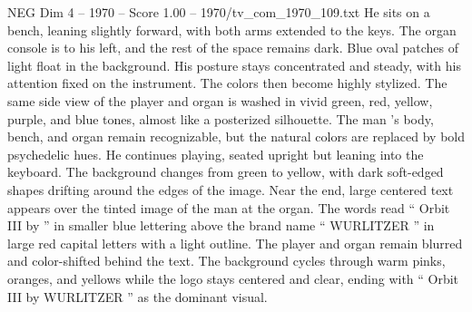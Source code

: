 \begin{textsample}{NEG Dim 4 – 1970 – Score 1.00 – 1970/tv\_com\_1970\_109.txt}
He sits on a bench, leaning slightly forward, with both arms extended to the keys.
The organ console is to his left, and the rest of the space remains dark.
Blue oval patches of light float in the background.
His posture stays concentrated and steady, with his attention fixed on the instrument.
The colors then become highly stylized.
The same side view of the player and organ is washed in vivid green, red, yellow, purple, and blue tones, almost like a posterized silhouette.
The man ’s body, bench, and organ remain recognizable, but the natural colors are replaced by bold psychedelic hues.
He continues playing, seated upright but leaning into the keyboard.
The background changes from green to yellow, with dark soft-edged shapes drifting around the edges of the image.
Near the end, large centered text appears over the tinted image of the man at the organ.
The words read “ Orbit III by ” in smaller blue lettering above the brand name “ WURLITZER ” in large red capital letters with a light outline.
The player and organ remain blurred and color-shifted behind the text.
The background cycles through warm pinks, oranges, and yellows while the logo stays centered and clear, ending with “ Orbit III by WURLITZER ” as the dominant visual.

\end{textsample}
